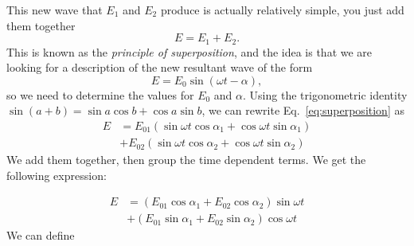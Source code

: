 This new wave that $E_1$ and $E_2$ produce is actually relatively simple, you just add them together
\begin{equation}
E=E_1+E_2.
\end{equation}
This is known as the \emph{principle of superposition}, and the idea is that we are looking for a description of the new resultant wave of the form
\begin{equation}
E=E_0 \sin (\omega t-\alpha),
\end{equation}
so we need to determine the values for $E_0$ and $\alpha$. Using the trigonometric identity $\sin (a + b)=\sin a \cos b +\cos a \sin b$, we can rewrite Eq.~\ref{eq:superposition} as
\begin{equation}
\begin{aligned}
E &=E_{01}\left(\sin \omega t \cos \alpha_{1}+\cos \omega t \sin \alpha_{1}\right) \\
&+E_{02}\left(\sin \omega t \cos \alpha_{2}+\cos \omega t \sin \alpha_{2}\right)
\end{aligned}
\end{equation}
We add them together, then group the time dependent terms. 
We get the following expression: 

\begin{equation}
\begin{aligned}
E &=\left(E_{01} \cos \alpha_{1}+E_{02} \cos \alpha_{2}\right) \sin \omega t \\
&+\left(E_{01} \sin \alpha_{1}+E_{02} \sin \alpha_{2}\right) \cos \omega t
\end{aligned}
\end{equation}
We can define

